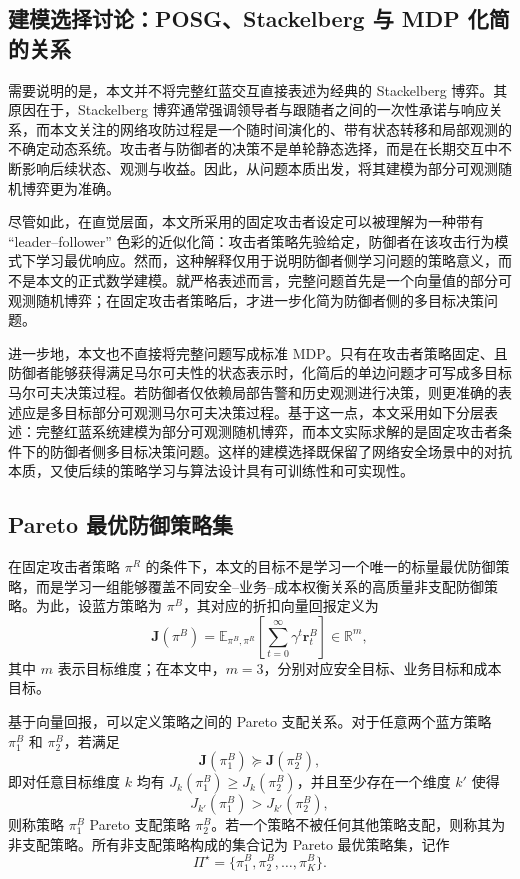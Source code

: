 \documentclass[12pt,a4paper]{article}
\begin{document}
\subsection{建模选择讨论：POSG、Stackelberg 与 MDP 化简的关系}

需要说明的是，本文并不将完整红蓝交互直接表述为经典的 Stackelberg 博弈。其原因在于，Stackelberg 博弈通常强调领导者与跟随者之间的一次性承诺与响应关系，而本文关注的网络攻防过程是一个随时间演化的、带有状态转移和局部观测的不确定动态系统。攻击者与防御者的决策不是单轮静态选择，而是在长期交互中不断影响后续状态、观测与收益。因此，从问题本质出发，将其建模为部分可观测随机博弈更为准确。

尽管如此，在直觉层面，本文所采用的固定攻击者设定可以被理解为一种带有 ``leader--follower'' 色彩的近似化简：攻击者策略先验给定，防御者在该攻击行为模式下学习最优响应。然而，这种解释仅用于说明防御者侧学习问题的策略意义，而不是本文的正式数学建模。就严格表述而言，完整问题首先是一个向量值的部分可观测随机博弈；在固定攻击者策略后，才进一步化简为防御者侧的多目标决策问题。

进一步地，本文也不直接将完整问题写成标准 MDP。只有在攻击者策略固定、且防御者能够获得满足马尔可夫性的状态表示时，化简后的单边问题才可写成多目标马尔可夫决策过程。若防御者仅依赖局部告警和历史观测进行决策，则更准确的表述应是多目标部分可观测马尔可夫决策过程。基于这一点，本文采用如下分层表述：完整红蓝系统建模为部分可观测随机博弈，而本文实际求解的是固定攻击者条件下的防御者侧多目标决策问题。这样的建模选择既保留了网络安全场景中的对抗本质，又使后续的策略学习与算法设计具有可训练性和可实现性。

\subsection{Pareto 最优防御策略集}

在固定攻击者策略 $\pi^R$ 的条件下，本文的目标不是学习一个唯一的标量最优防御策略，而是学习一组能够覆盖不同安全--业务--成本权衡关系的高质量非支配防御策略。为此，设蓝方策略为 $\pi^B$，其对应的折扣向量回报定义为
\begin{equation}
\mathbf{J}(\pi^B)
=
\mathbb{E}_{\pi^B,\pi^R}
\left[
\sum_{t=0}^{\infty}
\gamma^t \mathbf{r}_t^B
\right]
\in \mathbb{R}^m,
\end{equation}
其中 $m$ 表示目标维度；在本文中，$m=3$，分别对应安全目标、业务目标和成本目标。

基于向量回报，可以定义策略之间的 Pareto 支配关系。对于任意两个蓝方策略 $\pi_1^B$ 和 $\pi_2^B$，若满足
\begin{equation}
\mathbf{J}(\pi_1^B) \succeq \mathbf{J}(\pi_2^B),
\end{equation}
即对任意目标维度 $k$ 均有 $J_k(\pi_1^B) \geq J_k(\pi_2^B)$，并且至少存在一个维度 $k'$ 使得
\begin{equation}
J_{k'}(\pi_1^B) > J_{k'}(\pi_2^B),
\end{equation}
则称策略 $\pi_1^B$ Pareto 支配策略 $\pi_2^B$。若一个策略不被任何其他策略支配，则称其为非支配策略。所有非支配策略构成的集合记为 Pareto 最优策略集，记作
\begin{equation}
\Pi^\star = \{\pi_1^B,\pi_2^B,\dots,\pi_K^B\}.
\end{equation}
\end{document}
